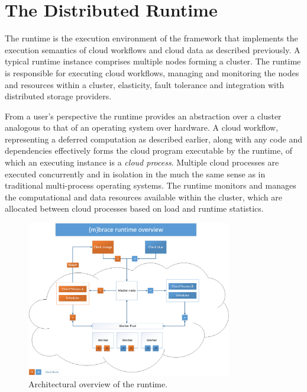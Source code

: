 %
%

\section{The \TitularMbrace{} Distributed Runtime}
\label{sec:runtime}

The \mbrace{} runtime is the execution environment of the \mbrace{} framework
that implements the execution semantics of cloud workflows and cloud data
as described previously. A typical \mbrace{} runtime instance comprises
multiple nodes forming a cluster. The runtime is responsible for executing cloud
workflows, managing and monitoring the nodes and resources within a cluster,
elasticity, fault tolerance and integration with distributed storage providers.

From a user's perspective the \mbrace{} runtime provides an abstraction over a
cluster analogous to that of an operating system over hardware. A cloud
workflow, representing a deferred computation as described earlier, along with
any code and dependencies effectively forms the cloud program executable by the
runtime, of which an executing instance is a \emph{cloud process}. Multiple
cloud processes are executed concurrently and in isolation in the much the same
sense as in traditional multi-process operating systems. The runtime monitors
and manages the computational and data resources available within the cluster,
which are allocated between cloud processes based on load and runtime
statistics.
%
\begin{figure}[ht]
\label{runtime-figure}
\centering
\includegraphics[width=0.8\textwidth]{runtime.png}
\caption{Architectural overview of the \mbrace{} runtime.}
\end{figure}

